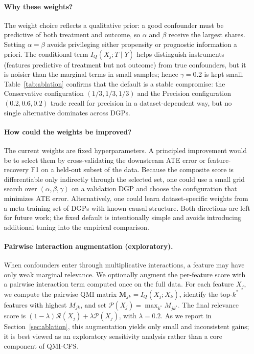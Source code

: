 \documentclass{svproc}
\newcommand{\QMI}{I_Q}
\begin{document}
\paragraph{Why these weights?} The weight choice reflects a qualitative prior: a good confounder must be predictive of both treatment and outcome, so $\alpha$ and $\beta$ receive the largest shares. Setting $\alpha=\beta$ avoids privileging either propensity or prognostic information a priori. The conditional term $\QMI(X_j; T \mid Y)$ helps distinguish instruments (features predictive of treatment but not outcome) from true confounders, but it is noisier than the marginal terms in small samples; hence $\gamma=0.2$ is kept small. Table~\ref{tab:ablation} confirms that the default is a stable compromise: the Conservative configuration $(1/3,1/3,1/3)$ and the Precision configuration $(0.2,0.6,0.2)$ trade recall for precision in a dataset-dependent way, but no single alternative dominates across DGPs.

\paragraph{How could the weights be improved?} The current weights are fixed hyperparameters. A principled improvement would be to select them by cross-validating the downstream ATE error or feature-recovery F1 on a held-out subset of the data. Because the composite score is differentiable only indirectly through the selected set, one could use a small grid search over $(\alpha,\beta,\gamma)$ on a validation DGP and choose the configuration that minimizes ATE error. Alternatively, one could learn dataset-specific weights from a meta-training set of DGPs with known causal structure. Both directions are left for future work; the fixed default is intentionally simple and avoids introducing additional tuning into the empirical comparison.

\paragraph{Pairwise interaction augmentation (exploratory).} When confounders enter through multiplicative interactions, a feature may have only weak marginal relevance. We optionally augment the per-feature score with a pairwise interaction term computed once on the full data. For each feature $X_j$, we compute the pairwise QMI matrix $\mathbf{M}_{jk} = \QMI(X_j; X_k)$, identify the top-$k^*$ features with highest $M_{jk}$, and set $\mathcal{P}(X_j) = \max_{k^*} M_{jk^*}$. The final relevance score is $(1-\lambda) \mathcal{R}(X_j) + \lambda \mathcal{P}(X_j)$, with $\lambda=0.2$. As we report in Section~\ref{sec:ablation}, this augmentation yields only small and inconsistent gains; it is best viewed as an exploratory sensitivity analysis rather than a core component of QMI-CFS.
\end{document}
